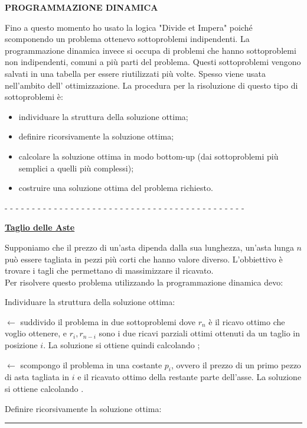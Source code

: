 \documentclass[8pt]{extarticle}
\newenvironment{formulario}
{
\setlength{\columnsep}{3em}
\twocolumn
\lstset{tabsize=3}
\begin{spacing}{1}
\begin{flushleft}
}{
\end{flushleft}
\end{spacing}
}
\newenvironment{tcenter}{
  \par
  \centering
  \setlength{\parskip}{0pt} %
  \noindent
}{
  \par
}
\newenvironment{Descr}
{
	\begin{description}[topsep=0pt,itemsep=0pt,partopsep=0pt, parsep=0pt]
}{
	\end{description}
}
\newenvironment{myParagraph}[1]
{
\begin{tcenter}
\textbf{#1}
\end{tcenter}
}{
\myRule
}
\newenvironment{subParagraph}[1]
{
\dashrule
\begin{tcenter}
\bo{\underline{#1}}\\
\end{tcenter}
}{}
\newcommand{\myRule}{\rule{250pt}{0.1pt}}
\newcommand{\bo}[1]{\textbf{#1}}
\newcommand{\la}{\leftarrow}
\newcommand{\dashrule}{\begin{tcenter}- - - - - - - - - - - - - - - - - - - - - - - - - - - - - - - - - - - - - - - - - - - - \; \end{tcenter}}
\newcommand{\get}{\la}
\begin{document}
\begin{formulario}
	\begin{myParagraph}{PROGRAMMAZIONE DINAMICA}
Fino a questo momento ho usato la logica "Divide et Impera" poiché scomponendo un problema ottenevo sottoproblemi indipendenti. La programmazione dinamica invece si occupa di problemi che hanno sottoproblemi non indipendenti, comuni a più parti del problema. Questi sottoproblemi vengono salvati in una tabella per essere riutilizzati più volte. Spesso viene usata nell'ambito dell' ottimizzazione. La procedura per la risoluzione di questo tipo di sottoproblemi è:
			\begin{itemize} 
				\item individuare la struttura della soluzione ottima;
				\item definire ricorsivamente la soluzione ottima;
				\item calcolare la soluzione ottima in modo bottom-up (dai sottoproblemi più semplici a quelli più complessi);
				\item costruire una soluzione ottima del problema richiesto.
			\end{itemize}
		\begin{subParagraph}{Taglio delle Aste}
Supponiamo che il prezzo di un'asta dipenda dalla sua lunghezza, un'asta lunga $n$ può essere tagliata in pezzi più corti che hanno valore diverso. L'obbiettivo è trovare i tagli che permettano di massimizzare il ricavato. \\
Per risolvere questo problema utilizzando la programmazione dinamica devo:
			\begin{itemize}
				\item Individuare la struttura della soluzione ottima:\\
				\begin{Descr}
					\item[\bm{$r_n=r_i+r_{n-i}$}] $\get$ suddivido il problema in due sottoproblemi dove $r_n$ è il ricavo ottimo che voglio ottenere, e $r_i,r_{n-i}$ sono i due ricavi parziali ottimi ottenuti da un taglio in posizione $i$. La soluzione si ottiene quindi calcolando ;
					\item[\bm{$r_n=p_i+r_{n-i}$}] $\get$ scompongo il problema in una costante $p_i$, ovvero il prezzo di un primo pezzo di asta tagliata in $i$ e il ricavato ottimo della restante parte dell'asse. La soluzione si ottiene calcolando .
				\end{Descr}
				\item Definire ricorsivamente la soluzione ottima:\\

\end{itemize}
\end{subParagraph}
\end{myParagraph}
\end{formulario}
\end{document}
